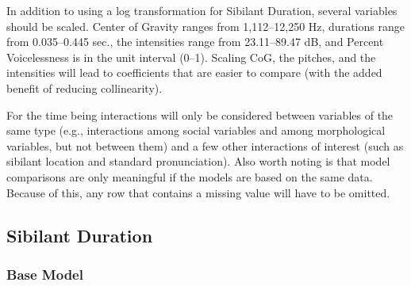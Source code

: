 \documentclass[a4paper]{article}
\begin{document}



In addition to using a log transformation for Sibilant Duration,
several variables should be scaled.  Center of Gravity ranges from
1,112--12,250 Hz,  durations range from 0.035--0.445
sec., the intensities range from 23.11--89.47 dB, and Percent
Voicelessness is in the unit interval (0--1).  Scaling CoG, the pitches, and the
intensities will lead to coefficients that are easier to compare (with
the added benefit of reducing collinearity).

For the time being interactions will only be considered between variables of the same
type (e.g., interactions among social variables
and among morphological variables, but not between them) and a few
other interactions of interest (such as sibilant location and standard
pronunciation).  Also worth noting is that model comparisons are only
meaningful if the models are based on the same data.  Because of this,
any row that contains a missing value will have to be omitted.


\subsection*{Sibilant Duration}
\subsubsection*{Base Model}
\end{document}
